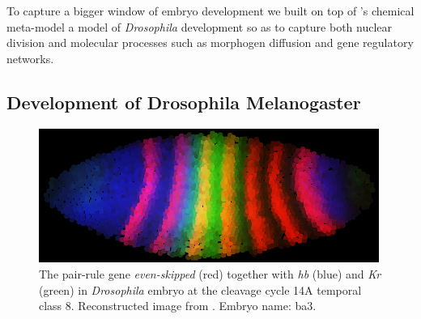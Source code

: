 \documentclass[12pt,a4paper,twoside,openright]{book}
\begin{document}
To capture a bigger window of embryo development we built on top of \alchemist{}'s chemical meta-model a model of \emph{Drosophila} development so as to capture  both nuclear division and molecular processes such as  morphogen diffusion and gene regulatory networks.

\subsection{Development of Drosophila Melanogaster}

\begin{figure}
\centering
\includegraphics[width=0.99\textwidth]{img/drosophila}
\caption[Drosophila Melanogaster embryo at the cleavage cycle 14A temporal class 8]{The pair-rule gene  \emph{even-skipped} (red) together with \emph{hb} (blue) and \emph{Kr} (green) in \emph{Drosophila} embryo at the cleavage cycle 14A temporal class 8. Reconstructed image from \cite{flyex2009}. Embryo name: ba3. }
\label{fig:drosophila}       %
\end{figure}
\end{document}
